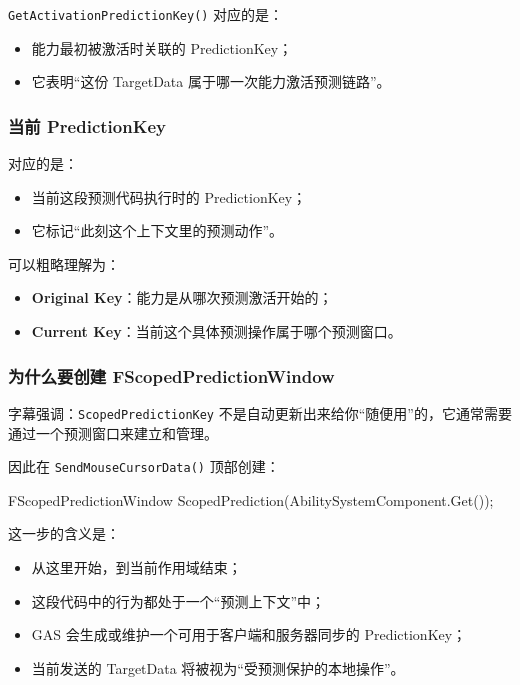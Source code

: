 \documentclass[10pt,CJKmath]{ctexart}
\begin{document}
\texttt{GetActivationPredictionKey()} 对应的是：

\begin{itemize}
	\item 能力最初被激活时关联的 PredictionKey；
	\item 它表明“这份 TargetData 属于哪一次能力激活预测链路”。
\end{itemize}

\subsubsection{当前 PredictionKey}

 对应的是：

\begin{itemize}
	\item 当前这段预测代码执行时的 PredictionKey；
	\item 它标记“此刻这个上下文里的预测动作”。
\end{itemize}

可以粗略理解为：

\begin{itemize}
	\item \textbf{Original Key}：能力是从哪次预测激活开始的；
	\item \textbf{Current Key}：当前这个具体预测操作属于哪个预测窗口。
\end{itemize}

\subsubsection{为什么要创建 FScopedPredictionWindow}

字幕强调：\texttt{ScopedPredictionKey} 不是自动更新出来给你“随便用”的，它通常需要通过一个预测窗口来建立和管理。

因此在 \texttt{SendMouseCursorData()} 顶部创建：

\begin{code}
FScopedPredictionWindow ScopedPrediction(AbilitySystemComponent.Get());
\end{code}

这一步的含义是：

\begin{itemize}
	\item 从这里开始，到当前作用域结束；
	\item 这段代码中的行为都处于一个“预测上下文”中；
	\item GAS 会生成或维护一个可用于客户端和服务器同步的 PredictionKey；
	\item 当前发送的 TargetData 将被视为“受预测保护的本地操作”。
\end{itemize}
\end{document}
